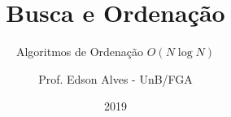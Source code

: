 \title{Busca e Ordenação}
\subtitle{Algoritmos de Ordenação $O(N\log N)$}
\author{Prof. Edson Alves - UnB/FGA}
\date{2019}
